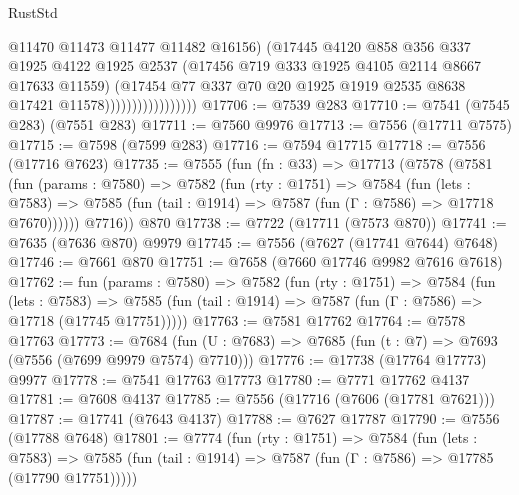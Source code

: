 \begin{lexlean}{RustStd}
\begin{coremodule}
{\begin{coremodule}
{{{{{{{{{{{{{{{{{{{{{{{{{{{{{{{{{{{{{{{{{{{                                    @11470
                                    @11473
                                    @11477
                                    @11482
                                    @16156)
                                  (@17445
                                    @4120
                                    @858
                                    @356
                                    @337
                                    @1925
                                    @4122
                                    @1925
                                    @2537
                                    (@17456 @719 @333 @1925 @4105 @2114 @8667 @17633 @11559)
                                    (@17454
                                      @77
                                      @337
                                      @70
                                      @20
                                      @1925
                                      @1919
                                      @2535
                                      @8638
                                      @17421
                                      @11578)))))))))))))))))
@17706 := @7539 @283
@17710 := @7541 (@7545 @283) (@7551 @283)
@17711 := @7560 @9976
@17713 := @7556 (@17711 @7575)
@17715 := @7598 (@7599 @283)
@17716 := @7594 @17715
@17718 := @7556 (@17716 @7623)
@17735 := @7555
    (fun (fn : @33) =>
    @17713
      (@7578
        (@7581
          (fun (params : @7580) =>
          @7582
            (fun (rty : @1751) =>
            @7584
              (fun (lets : @7583) =>
              @7585 (fun (tail : @1914) => @7587 (fun (Γ : @7586) => @17718 @7670))))))
        @7716))
    @870
@17738 := @7722 (@17711 (@7573 @870))
@17741 := @7635 (@7636 @870) @9979
@17745 := @7556 (@7627 (@17741 @7644) @7648)
@17746 := @7661 @870
@17751 := @7658 (@7660 @17746 @9982 @7616 @7618)
@17762 := fun (params : @7580) =>
  @7582
    (fun (rty : @1751) =>
    @7584
      (fun (lets : @7583) =>
      @7585 (fun (tail : @1914) => @7587 (fun (Γ : @7586) => @17718 (@17745 @17751)))))
@17763 := @7581 @17762
@17764 := @7578 @17763
@17773 := @7684 (fun (U : @7683) => @7685 (fun (t : @7) => @7693 (@7556 (@7699 @9979 @7574) @7710)))
@17776 := @17738 (@17764 @17773) @9977
@17778 := @7541 @17763 @17773
@17780 := @7771 @17762 @4137
@17781 := @7608 @4137
@17785 := @7556 (@17716 (@7606 (@17781 @7621)))
@17787 := @17741 (@7643 @4137)
@17788 := @7627 @17787
@17790 := @7556 (@17788 @7648)
@17801 := @7774
    (fun (rty : @1751) =>
    @7584
      (fun (lets : @7583) =>
      @7585 (fun (tail : @1914) => @7587 (fun (Γ : @7586) => @17785 (@17790 @17751)))))
}}}}}}}}}}}}}}}}}}}}}}}}}}}}}}}}}}}}}}}}}}}
\end{coremodule}}
\end{coremodule}
\end{lexlean}
